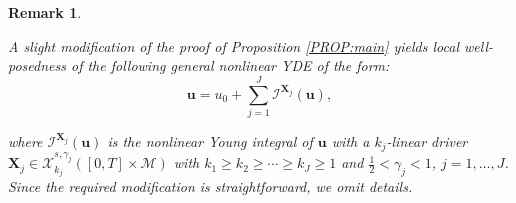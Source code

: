 \documentclass[letterpaper, 11pt,  reqno]{amsart}
\newtheorem{remark}[theorem]{Remark}
\newcommand{\1}{\hspace{0.5mm}\textup{I}\hspace{0.5mm}}
\newcommand{\I}{\mathcal{I}}
\newcommand{\noi}{\noindent}
\newcommand{\g}{\gamma}
\newcommand{\M}{\mathcal{M}}
\newcommand{\cX}{\mathcal{X}}
\newcommand{\uu}{\mathbf{u}}
\newcommand{\XX}{\mathbf{X}}
\numberwithin{equation}{section}
\numberwithin{theorem}{section}
\begin{document}
\begin{remark} \label{REMLmain2}
\rm


A slight modification of the proof of Proposition \ref{PROP:main}
yields
local well-posedness
of the following general 
nonlinear   YDE  of  the  form:
\begin{equation*}
\label{YDE4}
\uu = u_0 + \sum_{j = 1}^J \I^{\XX_j}(\uu), 
\end{equation*}


\noi
where $\I^{\XX_j}(\uu)$ is the nonlinear Young integral of 
$\uu$ with a $k_j$-linear driver 
$\XX_j\in \cX^{s, \g_j}_{k_j}([0, T] \times \M)$
with $k_1 \ge k_2 \ge \cdots \ge k_J \ge 1$
and $\frac 12 < \g_j < 1$, $j = 1, \dots, J$.
Since the required modification is straightforward, we omit details.












\end{remark}
\end{document}
